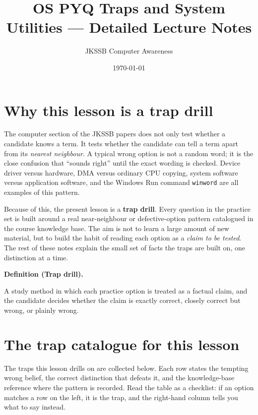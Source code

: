 \documentclass[11pt]{article}
\title{OS PYQ Traps and System Utilities --- Detailed Lecture Notes}
\author{JKSSB Computer Awareness}
\date{\today}
\newenvironment{definitionbox}[1]{%
  \par\noindent\textbf{Definition (#1).}\ \itshape
}{\par\vspace{0.3em}}
\begin{document}
\maketitle

\section{Why this lesson is a trap drill}
The computer section of the JKSSB papers does not only test whether a
candidate knows a term. It tests whether the candidate can tell a term apart
from its \emph{nearest neighbour}. A typical wrong option is not a random
word; it is the close confusion that ``sounds right'' until the exact wording
is checked. Device driver versus hardware, DMA versus ordinary CPU copying,
system software versus application software, and the Windows Run command
\texttt{winword} are all examples of this pattern.

Because of this, the present lesson is a \textbf{trap drill}. Every question
in the practice set is built around a real near-neighbour or defective-option
pattern catalogued in the course knowledge base. The aim is not to learn a
large amount of new material, but to build the habit of reading each option
as a \emph{claim to be tested}. The rest of these notes explain the small set
of facts the traps are built on, one distinction at a time.

\begin{definitionbox}{Trap drill}
A study method in which each practice option is treated as a factual claim,
and the candidate decides whether the claim is exactly correct, closely
correct but wrong, or plainly wrong.
\end{definitionbox}

\section{The trap catalogue for this lesson}
The traps this lesson drills on are collected below. Each row states the
tempting wrong belief, the correct distinction that defeats it, and the
knowledge-base reference where the pattern is recorded. Read the table as a
checklist: if an option matches a row on the left, it is the trap, and the
right-hand column tells you what to say instead.
\end{document}
